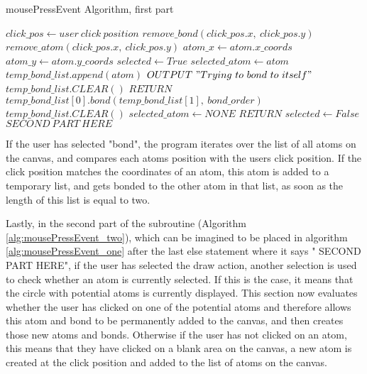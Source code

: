 \documentclass[a4paper,12pt]{article}
\begin{document}
\begin{algorithm}
\footnotesize
\caption{mousePressEvent Algorithm, first part}\label{alg:mousePressEvent_one}
\begin{algorithmic}
	\State $ click\_pos\gets user\ click\ position$
		\State $ remove\_bond(click\_pos.x,\ click\_pos.y)$
		\State $ remove\_atom(click\_pos.x,\ click\_pos.y)$
			\State $ atom\_x\gets atom.x\_coords$
			\State $ atom\_y\gets atom.y\_coords$
				\State $ selected\gets True$
				\State $ selected\_atom\gets atom$
				\State $ temp\_bond\_list.append(atom)$
						\State $ OUTPUT\ "Trying\ to\ bond\ to\ itself"$
						\State $ temp\_bond\_list.CLEAR()$
						\State $ RETURN$
					\EndIf
					\State $ temp\_bond\_list[0].bond(temp\_bond\_list[1],\ bond\_order)$
					\State $ temp\_bond\_list.CLEAR()$
					\State $ selected\_atom\gets NONE$
				\EndIf
				\State $ RETURN$
			\EndIf
			\State $ selected\gets False$
		\EndFor
	\Else
		\State $ SECOND\ PART\ HERE$
	\EndIf
\EndIf
\EndFunction
\end{algorithmic}
\end{algorithm}

If the user has selected "bond", the program iterates over the list of all atoms on the canvas, and compares each atoms position with the users click position. If the click position matches the coordinates of an atom, this atom is added to a temporary list, and gets bonded to the other atom in that list, as soon as the length of this list is equal to two.

\newpage

Lastly, in the second part of the subroutine (Algorithm \ref{alg:mousePressEvent_two}), which can be imagined to be placed in algorithm \ref{alg:mousePressEvent_one} after the last else statement where it says " SECOND PART HERE", if the user has selected the draw action, another selection is used to check whether an atom is currently selected. If this is the case, it means that the circle with potential atoms is currently displayed. This section now evaluates whether the user has clicked on one of the potential atoms and therefore allows this atom and bond to be permanently added to the canvas, and then creates those new atoms and bonds. Otherwise if the user has not clicked on an atom, this means that they have clicked on a blank area on the canvas, a new atom is created at the click position and added to the list of atoms on the canvas.
\end{document}
